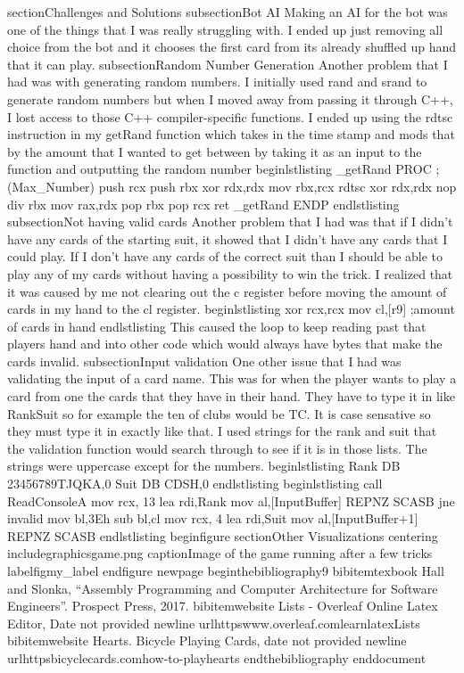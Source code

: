 section{Challenges and Solutions}
subsection{Bot AI}
Making an AI for the bot was one of the things that I was really struggling with. I ended up just removing all choice from the bot and it chooses the first card from its already shuffled up hand that it can play.
subsection{Random Number Generation}
Another problem that I had was with generating random numbers. I initially used rand and srand to generate random numbers but when I moved away from passing it through C++, I lost access to those C++ compiler-specific functions. I ended up using the rdtsc instruction in my getRand function which takes in the time stamp and mods that by the amount that I wanted to get between by taking it as an input to the function and outputting the random number
begin{lstlisting}
_getRand PROC ; (Max_Number)
push rcx
push rbx
xor rdx,rdx
mov rbx,rcx
rdtsc
xor rdx,rdx
nop
div rbx
mov rax,rdx
pop rbx
pop rcx
ret
_getRand ENDP
end{lstlisting}
subsection{Not having valid cards}
Another problem that I had was that if I didn't have any cards of the starting suit, it showed that I didn't have any cards that I could play. If I don't have any cards of the correct suit than I should be able to play any of my cards without having a possibility to win the trick. I realized that it was caused by me not clearing out the c register before moving the amount of cards in my hand to the cl register. 
begin{lstlisting}
xor rcx,rcx
mov cl,[r9] ;amount of cards in hand
end{lstlisting}
This caused the loop to keep reading past that players hand and into other code which would always have bytes that make the cards invalid.
subsection{Input validation}
One other issue that I had was validating the input of a card name. This was for when the player wants to play a card from one the cards that they have in their hand. They have to type it in like RankSuit so for example the ten of clubs would be TC. It is case sensative so they must type it in exactly like that. I used strings for the rank and suit that the validation function would search through to see if it is in those lists. The strings were uppercase except for the numbers.
begin{lstlisting}
Rank DB 23456789TJQKA,0
Suit DB CDSH,0
end{lstlisting}
begin{lstlisting}
call ReadConsoleA
mov rcx, 13
lea rdi,Rank
mov al,[InputBuffer]
REPNZ SCASB
jne invalid
mov bl,3Eh
sub bl,cl
mov rcx, 4
lea rdi,Suit
mov al,[InputBuffer+1]
REPNZ SCASB
end{lstlisting}
begin{figure}
section{Other Visualizations}
    centering
    includegraphics{game.png}
    caption{Image of the game running after a few tricks}
    label{figmy_label}
end{figure}
newpage
begin{thebibliography}{9}
bibitem{texbook}
Hall and Slonka, “Assembly Programming and Computer Architecture for Software Engineers”.
Prospect Press, 2017.
bibitem{website} Lists - Overleaf Online Latex Editor, Date not provided
newline
url{httpswww.overleaf.comlearnlatexLists}
bibitem{website}
Hearts. Bicycle Playing Cards, date not provided
newline
url{httpsbicyclecards.comhow-to-playhearts}
end{thebibliography}
end{document}